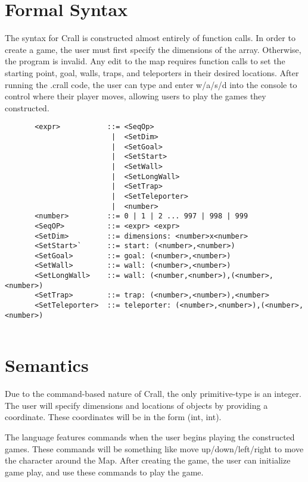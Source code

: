 \documentclass[10pt]{article}
\begin{document}
    \section{Formal Syntax}
    
    The syntax for Crall is constructed almost entirely of function calls. In order to create a game, the user must first specify the dimensions of the array. Otherwise, the program is invalid. Any edit to the map requires function calls to set the starting point, goal, walls, traps, and teleporters in their desired locations. After running the .crall code, the user can type and enter w/a/s/d into the console to control where their player moves, allowing users to play the games they constructed. 
    
    \begin{verbatim}
       <expr>           ::= <SeqOp>
                         |  <SetDim>
                         |  <SetGoal>
                         |  <SetStart>
                         |  <SetWall>
                         |  <SetLongWall>
                         |  <SetTrap>
                         |  <SetTeleporter>
                         |  <number>
       <number>         ::= 0 | 1 | 2 ... 997 | 998 | 999
       <SeqOP>          ::= <expr> <expr>
       <SetDim>         ::= dimensions: <number>x<number>
       <SetStart>`      ::= start: (<number>,<number>)
       <SetGoal>        ::= goal: (<number>,<number>)
       <SetWall>        ::= wall: (<number>,<number>)
       <SetLongWall>    ::= wall: (<number,<number>),(<number>,<number>)
       <SetTrap>        ::= trap: (<number>,<number>),<number>
       <SetTeleporter>  ::= teleporter: (<number>,<number>),(<number>,<number>)
    
    \end{verbatim}
    
    \section{Semantics}

    Due to the command-based nature of Crall, the only primitive-type is an integer. The user will specify dimensions and locations of objects by providing a coordinate. These coordinates will be in the form (int, int).

    The language features commands when the user begins playing the constructed games. These commands will be something like move up/down/left/right to move the character around the Map. After creating the game, the user can initialize game play, and use these commands to play the game.
    
\end{document}
